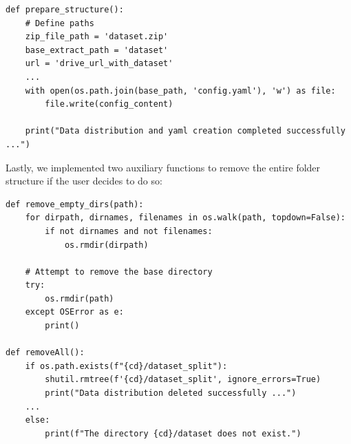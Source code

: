 \documentclass[../main]{subfiles}
\begin{document}
\newpage
\begin{lstlisting}
def prepare_structure():
    # Define paths
    zip_file_path = 'dataset.zip'
    base_extract_path = 'dataset'
    url = 'drive_url_with_dataset'
    ...
    with open(os.path.join(base_path, 'config.yaml'), 'w') as file:
        file.write(config_content)

    print("Data distribution and yaml creation completed successfully ...")
\end{lstlisting}
Lastly, we implemented two auxiliary functions to remove the entire folder structure if the user decides to do so:
\begin{lstlisting}
def remove_empty_dirs(path):
    for dirpath, dirnames, filenames in os.walk(path, topdown=False):
        if not dirnames and not filenames:
            os.rmdir(dirpath)

    # Attempt to remove the base directory
    try:
        os.rmdir(path)
    except OSError as e:
        print()

def removeAll():
    if os.path.exists(f"{cd}/dataset_split"):
        shutil.rmtree(f'{cd}/dataset_split', ignore_errors=True)
        print("Data distribution deleted successfully ...")
    ...
    else:
        print(f"The directory {cd}/dataset does not exist.")
\end{lstlisting}
\end{document}
